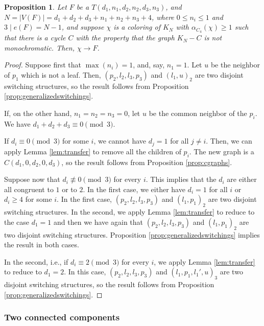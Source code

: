 \documentclass[11pt]{article}
\newtheorem{proposition}[theorem]{Proposition}
\begin{document}
\begin{proposition}\label{prop:tgraphs}
        Let $F$ be a $T(d_1,n_1,d_2,n_2,d_3,n_3)$, and $N=|V(F)|=d_1+d_2+d_3+n_1+n_2+n_3+4$, where $0 \leq n_i \leq 1$ and $3 \mid e(F) =  N-1$, and suppose $\chi$ is a coloring of $K_{N}$ with $\alpha_{C_4}(\chi) \geq 1$ such that there is a cycle $C$ with the property that the graph $K_{N}-C$ is not monochromatic. Then, $\chi \rightarrow F$.
\end{proposition}

\begin{proof}
    Suppose first that $\max(n_i)=1$, and, say, $n_1=1$. Let $u$ be the neighbor of $p_1$ which is not a leaf. Then, $(p_2,l_2,l_3,p_3)$ and $(l_1,u)_2$ are two disjoint switching structures, so the result follows from Proposition \ref{prop:generalizedswitchings}.

    If, on the other hand, $n_1=n_2=n_3=0$, let $u$ be the common neighbor of the $p_i$. We have $d_1+d_2+d_3 \equiv 0 \pmod 3$. 

    If $d_i \equiv 0 \pmod 3$ for some $i$, we cannot have $d_j=1$ for all $j \neq i$. Then, we can apply Lemma \ref{lem:transfer} to remove all the children of $p_i$. The new graph is a $C(d_1,0,d_2,0,d_3)$, so the result follows from Proposition \ref{prop:cgraphs}.

    Suppose now that $d_i \not\equiv 0 \pmod 3$ for every $i$. This implies that the $d_i$ are either all congruent to $1$ or to $2$.
    In the first case, we either have $d_i=1$ for all $i$ or $d_i \geq 4$ for some $i$. In the first case, $(p_2,l_2,l_3,p_3)$ and $(l_1,p_1)_2$ are two disjoint switching structures. In the second, we apply Lemma \ref{lem:transfer} to reduce to the case $d_1=1$ and then we have again that $(p_2,l_2,l_3,p_3)$ and $(l_1,p_1)_2$ are two disjoint switching structures. Proposition \ref{prop:generalizedswitchings} implies the result in both cases.

    In the second, i.e., if $d_i \equiv 2 \pmod 3$ for every $i$, we apply Lemma \ref{lem:transfer} to reduce to $d_1=2$. In this case, $(p_2,l_2,l_3,p_3)$ and $(l_1,p_1,l_1',u)_3$ are two disjoint switching structures, so the result follows from Proposition \ref{prop:generalizedswitchings}.

\end{proof}

\subsubsection{Two connected components}\label{subsubsec:2comp}
\end{document}
